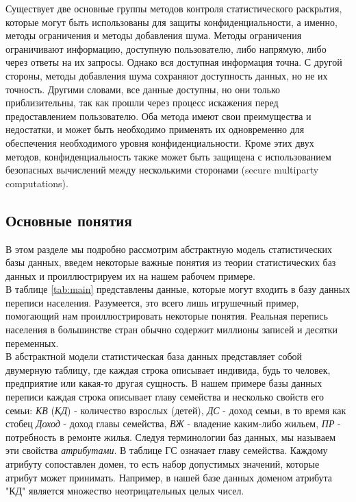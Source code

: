 Существует две основные группы методов контроля статистического раскрытия, которые могут быть использованы для защиты конфиденциальности, а именно, методы ограничения и методы добавления шума. Методы ограничения ограничивают информацию, доступную пользователю, либо напрямую, либо через ответы на их запросы. Однако вся доступная информация точна. С другой стороны, методы добавления шума сохраняют доступность данных, но не их точность. Другими словами, все данные доступны, но они только приблизительны, так как прошли через процесс искажения перед предоставлением пользователю. Оба метода имеют свои преимущества и недостатки, и может быть необходимо применять их одновременно для обеспечения необходимого уровня конфиденциальности. Кроме этих двух методов, конфиденциальность также может быть защищена с использованием безопасных вычислений между несколькими сторонами (secure multiparty computations).
\\

\subsection{Основные понятия}
В этом разделе мы подробно рассмотрим абстрактную модель статистических базы данных, введем некоторые важные понятия из теории статистических баз данных и проиллюстрируем их на нашем рабочем примере.
\\

В таблице \ref{tab:main} представлены данные, которые могут входить в базу данных переписи населения. Разумеется, это всего лишь игрушечный пример, помогающий нам проиллюстрировать некоторые понятия. Реальная перепись населения в большинстве стран обычно содержит миллионы записей и десятки переменных.
\\

В абстрактной модели статистическая база данных представляет собой двумерную таблицу, где каждая строка описывает индивида, будь то человек, предприятие или какая-то другая сущность. В нашем примере базы данных переписи каждая строка описывает главу семейства и несколько свойств его семьи: \textit{КВ} (\textit{КД}) - количество взрослых (детей), \textit{ДС} - доход семьи, в то время как стобец \textit{Доход} - доход главы семейства, \textit{ВЖ} - владение каким-либо жильем, \textit{ПР} - потребность в ремонте жилья. Следуя терминологии баз данных, мы называем эти свойства \textit{атрибутами}. В таблице ГС означает главу семейства. Каждому атрибуту сопоставлен домен, то есть набор допустимых значений, которые атрибут может принимать. Например, в нашей базе данных доменом атрибута "КД" является множество неотрицательных целых чисел.
\\


